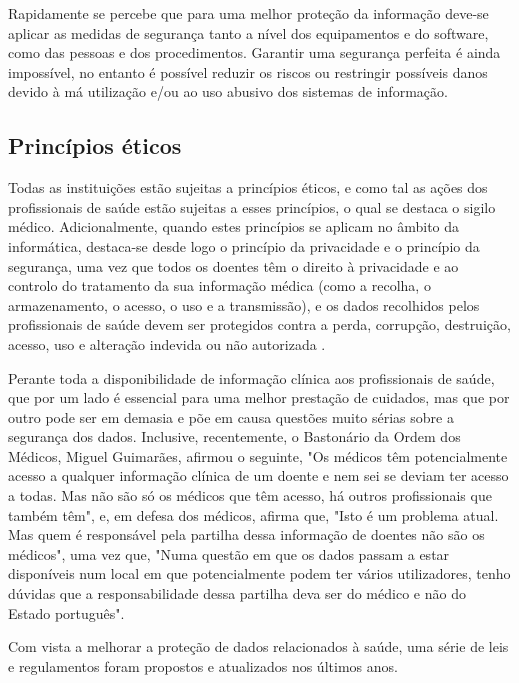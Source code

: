 \documentclass[conference]{IEEEtran}
\begin{document}
Rapidamente se percebe que para uma melhor proteção da informação deve-se aplicar as medidas de segurança tanto a nível dos equipamentos e do software, como das pessoas e dos procedimentos. Garantir uma segurança perfeita é ainda impossível, no entanto é possível reduzir os riscos ou restringir possíveis danos devido à má utilização e/ou ao uso abusivo dos sistemas de informação.


\subsection{Princípios éticos}

Todas as instituições estão sujeitas a princípios éticos, e como tal as ações dos profissionais de saúde estão sujeitas a esses princípios, o qual se destaca o sigilo médico. Adicionalmente, quando estes princípios se aplicam no âmbito da informática, destaca-se desde logo o princípio da privacidade e o princípio da segurança, uma vez que todos os doentes têm o direito à privacidade e ao controlo do tratamento da sua informação médica (como a recolha, o armazenamento, o acesso, o uso e a transmissão), e os dados recolhidos pelos profissionais de saúde devem ser protegidos contra a perda, corrupção, destruição, acesso, uso e alteração indevida ou não autorizada \cite{segurancaSI}.

Perante toda a disponibilidade de informação clínica aos profissionais de saúde, que por um lado é essencial para uma melhor prestação de cuidados, mas que por outro pode ser em demasia e põe em causa questões muito sérias sobre a segurança dos dados. Inclusive, recentemente, o Bastonário da Ordem dos Médicos, Miguel Guimarães, afirmou o seguinte, "Os médicos têm potencialmente acesso a qualquer informação clínica de um doente e nem sei se deviam ter acesso a todas. Mas não são só os médicos que têm acesso, há outros profissionais que também têm", e, em defesa dos médicos, afirma que, "Isto é um problema atual. Mas quem é responsável pela partilha dessa informação de doentes não são os médicos", uma vez que, "Numa questão em que os dados passam a estar disponíveis num local em que potencialmente podem ter vários utilizadores, tenho dúvidas que a responsabilidade dessa partilha deva ser do médico e não do Estado português".

Com vista a melhorar a proteção de dados relacionados à saúde, uma série de leis e regulamentos foram propostos e atualizados nos últimos anos.
\end{document}
